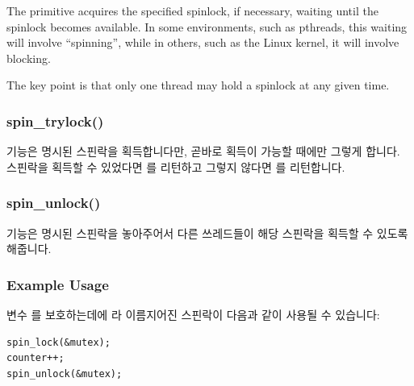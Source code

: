 The  primitive acquires the specified spinlock,
if necessary, waiting until the spinlock becomes available.
In some environments, such as pthreads, this waiting will involve
``spinning'', while
in others, such as the Linux kernel, it will involve blocking.

The key point is that only one thread may hold a spinlock at any
given time.
\fi

\subsubsection{spin\_trylock()}

 기능은 명시된 스핀락을 획득합니다만, 곧바로 획득이 가능할
때에만 그렇게 합니다.
스핀락을 획득할 수 있었다면  를 리턴하고 그렇지 않다면  를
리턴합니다.

\subsubsection{spin\_unlock()}

 기능은 명시된 스핀락을 놓아주어서 다른 쓰레드들이 해당
스핀락을 획득할 수 있도록 해줍니다.

\subsubsection{Example Usage}

변수  를 보호하는데에  라 이름지어진 스핀락이 다음과 같이
사용될 수 있습니다:

\vspace{5pt}
\begin{minipage}[t]{\columnwidth}
\small
\begin{verbatim}
spin_lock(&mutex);
counter++;
spin_unlock(&mutex);
\end{verbatim}
\end{minipage}
\vspace{5pt}

